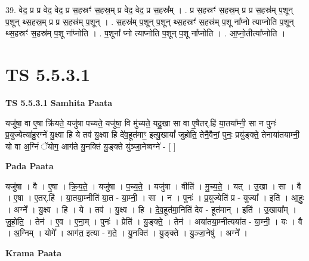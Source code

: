 \documentclass[17pt]{extarticle}
\begin{document}
39. वेद॒ प्र प्र वेद॒ वेद॒ प्र स॒हस्रꣳ॑ स॒हस्र॒म् प्र वेद॒ वेद॒ प्र स॒हस्र᳚म् । . प्र स॒हस्रꣳ॑ स॒हस्र॒म् प्र प्र स॒हस्र॑म् प॒शून् प॒शून् थ्स॒हस्र॒म् प्र प्र स॒हस्र॑म् प॒शून् । . स॒हस्र॑म् प॒शून् प॒शून् थ्स॒हस्रꣳ॑ स॒हस्र॑म् प॒शू ना᳚प्नो त्याप्नोति प॒शून् थ्स॒हस्रꣳ॑ स॒हस्र॑म् प॒शू ना᳚प्नोति । . प॒शूना᳚ प्नो त्याप्नोति प॒शून् प॒शू ना᳚प्नोति । . आ॒प्नो॒तीत्या᳚प्नोति । \newline
\pagebreak
{}

\section{ TS 5.5.3.1 }

\textbf{TS 5.5.3.1 } \newline
\textbf{Samhita Paata} \newline

यजु॑षा॒ वा ए॒षा क्रि॑यते॒ यजु॑षा पच्यते॒ यजु॑षा॒ वि मु॑च्यते॒ यदु॒खा सा वा ए॒षैतर्.हि॑ या॒तया᳚म्नी॒ सा न पुनः॑ प्र॒युज्येत्या॑हु॒रग्ने॑ यु॒क्ष्वा हि ये तव॑ यु॒क्ष्वा हि दे॑व॒हूत॑माꣳ॒॒ इत्यु॒खायां᳚ जुहोति॒ तेनै॒वैनां॒ पुनः॒ प्रयु॑ङ्क्ते॒ तेनाया॑तयाम्नी॒ यो वा अ॒ग्निं ॅयोग॒ आग॑ते यु॒नक्ति॑ यु॒ङ्क्ते यु॑ञ्जा॒नेष्वग्ने॑ - [  ] \newline

\textbf{Pada Paata} \newline

यजु॑षा । वै । ए॒षा । क्रि॒य॒ते॒ । यजु॑षा । प॒च्य॒ते॒ । यजु॑षा । वीति॑ । मु॒च्य॒ते॒ । यत् । उ॒खा । सा । वै । ए॒षा । ए॒तर्.हि॑ । या॒तया॒म्नीति॑ या॒त - या॒म्नी॒ । सा । न । पुनः॑ । प्र॒युज्येति॑ प्र - युज्या᳚ । इति॑ । आ॒हुः॒ । अग्ने᳚ । यु॒क्ष्व । हि । ये । तव॑ । यु॒क्ष्व । हि । दे॒व॒हूत॑मा॒निति॑ देव - हूत॑मान् । इति॑ । उ॒खाया᳚म् । जु॒हो॒ति॒ । तेन॑ । ए॒व । ए॒ना॒म् । पुनः॑ । प्रेति॑ । यु॒ङ्क्ते॒ । तेन॑ । अया॑तया॒म्नीत्यया॑त - या॒म्नी॒ । यः । वै । अ॒ग्निम् । योगे᳚ । आग॑त॒ इत्या - ग॒ते॒ । यु॒नक्ति॑ । यु॒ङ्क्ते । यु॒ञ्जा॒नेषु॑ । अग्ने᳚ ।  \newline


\textbf{Krama Paata} \newline
\end{document}
